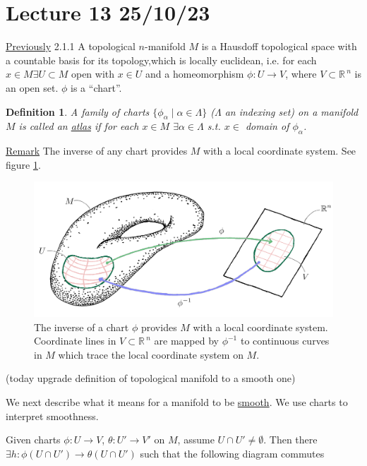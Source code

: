 \documentclass[12pt,a4paper]{article}
\newcommand{\rR}{\ensuremath{\mathbb{R}\,}}
\newcommand{\ul}[1]{\underline{#1}}
\newtheorem{defn}[thm]{Definition}
\begin{document}
\section{Lecture 13 25/10/23}

\ul{Previously} 2.1.1 A topological $n$-manifold $M$ is a Hausdoff topological space with a countable basis for its topology,which is locally euclidean, i.e. for each $x\in M  \exists U\subset M$ open with $x\in U$ and a homeomorphism $\phi:U \to V$, where $V\subset \rR^n$ is an open set. $\phi$ is a ``chart''. 

\begin{defn}
A family of charts $\{\phi_\alpha \mid \alpha \in \Lambda \}$ ($\Lambda$ an indexing set) on a manifold $M$ is called an \ul{atlas} if for each $x\in M$ $\exists \alpha \in \Lambda$ s.t. $x\in $ domain of $\phi_\alpha$.
\end{defn}

\ul{Remark} The inverse of any chart provides $M$ with a local coordinate system. See figure \ref{coord_patch}.

\begin{figure}
\center
\includegraphics[scale=0.5]{figs/coord_patch/manifold_phi_inv.png}
\caption{The inverse of a chart $\phi$ provides $M$ with a local coordinate system. Coordinate lines in $V \subset \rR^n$ are mapped by $\phi^{-1}$ to continuous curves in $M$ which trace the local coordinate system on $M$.}
\label{coord_patch}
\end{figure}

(today upgrade definition of topological manifold to a smooth one)

We next describe what it means for a manifold to be \ul{smooth}. We use charts to interpret smoothness.

Given charts $\phi: U\to V$, $\theta: U' \to V'$ on $M$, assume $U\cap U' \neq \emptyset $. Then there $\exists h : \phi(U\cap U')\to \theta(U\cap U')$ such that the following diagram commutes
\end{document}
